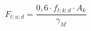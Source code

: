 \documentclass[12pt]{article}
\begin{document}
\begin{displaymath}
F_{t;u;d} = \frac {0,6 \cdot f_{t;k;d} \cdot A_k} {\gamma_M}
\end{displaymath}
\end{document}

